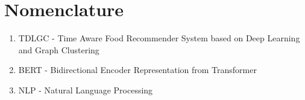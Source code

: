 \section*{\centering Nomenclature}
\begin{enumerate}
    \item TDLGC - Time Aware Food Recommender System based on Deep Learning and Graph Clustering
    \item BERT - Bidirectional Encoder Representation from Transformer
    \item NLP - Natural Language Processing
\end{enumerate}